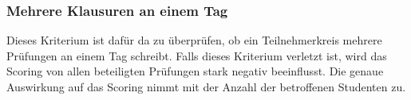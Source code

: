 \subsubsection{Mehrere Klausuren an einem Tag}
Dieses Kriterium ist dafür da zu überprüfen, ob ein Teilnehmerkreis mehrere Prüfungen
an einem Tag schreibt.
Falls dieses Kriterium verletzt ist, wird das Scoring von allen beteiligten Prüfungen stark negativ
beeinflusst.
Die genaue Auswirkung auf das Scoring nimmt mit der Anzahl der betroffenen Studenten zu.
